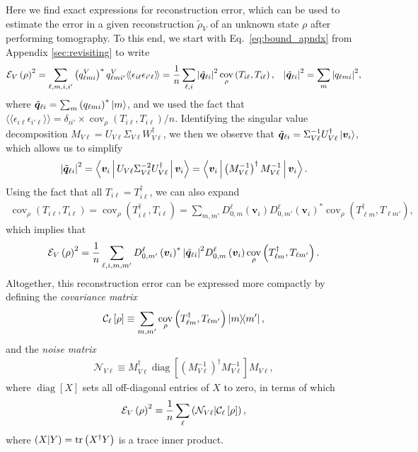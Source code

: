 \documentclass[nofootinbib,twocolumn]{revtex4-1}
\newcommand{\f}[2]{\dfrac{#1}{#2}} %
\newcommand{\p}[1]{\left(#1\right)} %
\renewcommand{\sp}[1]{\left[#1\right]} %
\newcommand{\bk}{\Braket} %
\newcommand{\bbk}[1]{\langle\!\langle #1 \rangle\!\rangle}
\newcommand{\C}{\mathcal{C}}
\newcommand{\E}{\mathcal{E}}
\newcommand{\N}{\mathcal{N}}
\def\obk#1{\mathinner{({#1})}}
\DeclareMathOperator{\cov}{cov}
\DeclareMathOperator{\diag}{diag}
\begin{document}
Here we find exact expressions for reconstruction error, which can be used to estimate the error in a given reconstruction $\tilde\rho_V$ of an unknown state $\rho$ after performing tomography.
To this end, we start with Eq.~\eqref{eq:bound_apndx} from Appendix \ref{sec:revisiting} to write
\begin{align}
  \E_V\p{\rho}^2
  = \sum_{\ell,m,i,i'} \p{q^V_{\ell mi}}^* q^V_{\ell mi'} \bbk{\epsilon_{i\ell}\epsilon_{i'\ell}}
  = \f1n \sum_{\ell,i} \abs{\tilde{\bm q}_{\ell i}}^2 \cov_\rho\p{T_{i\ell},T_{i\ell}},
  &&
  \abs{\tilde{\bm q}_{\ell i}}^2 = \sum_m \abs{q_{\ell mi}}^2,
  \label{eq:error_SM_start}
\end{align}
where $\tilde{\bm q}_{\ell i} = \sum_m \p{q_{\ell mi}}^* \ket{m}$, and we used the fact that $\bbk{\epsilon_{i\ell}\epsilon_{i'\ell}} = \delta_{ii'}\times\cov_\rho\p{T_{i\ell},T_{i\ell}}/n$.
Identifying the singular value decomposition $M_{V\ell} = U_{V\ell} \Sigma_{V\ell} W_{V\ell}^\dag$, we then we observe that $\tilde{\bm q}_{\ell i} = \Sigma_{V\ell}^{-1} U_{V\ell}^\dag \ket{\bm v_i}$, which allows us to simplify
\begin{align}
  \abs{\tilde{\bm q}_{\ell i}}^2
  = \bk{\bm v_i | U_{V\ell} \Sigma_{V\ell}^{-2} U_{V\ell}^\dag | \bm v_i}
  = \bk{\bm v_i| \p{M_{V\ell}^{-1}}^\dag M_{V\ell}^{-1} | \bm v_i}.
\end{align}
Using the fact that all $T_{i\ell}=T_{i\ell}^\dag$, we can also expand
\begin{align}
  \cov_\rho\p{T_{i\ell},T_{i\ell}}
  = \cov_\rho\p{T_{i\ell}^\dag,T_{i\ell}}
  = \sum_{m,m'} D^\ell_{0,m}\p{\bm v_i} D^\ell_{0,m'}\p{\bm v_i}^*
  \cov_\rho\p{T_{\ell m}^\dag, T_{\ell m'}},
\end{align}
which implies that
\begin{align}
  \E_V\p{\rho}^2
  = \f1n \sum_{\ell,i,m,m'}
  D^\ell_{0,m'}\p{\bm v_i}^* \abs{\tilde{\bm q}_{\ell i}}^2
  D^\ell_{0,m}\p{\bm v_i}
  \cov_\rho\p{T_{\ell m}^\dag, T_{\ell m'}}.
\end{align}
Altogether, this reconstruction error can be expressed more compactly by defining the {\it covariance matrix}
\begin{align}
  \C_\ell\sp{\rho} \equiv
  \sum_{m,m'} \cov_\rho\p{T_{\ell m}^\dag, T_{\ell m'}} \op{m}{m'},
\end{align}
and the {\it noise matrix}
\begin{align}
  \N_{V\ell} \equiv M_{V\ell}^\dag \diag\sp{\p{M_{V\ell}^{-1}}^\dag
    M_{V\ell}^{-1}} M_{V\ell},
\end{align}
where $\diag\sp{X}$ sets all off-diagonal entries of $X$ to zero, in terms of which
\begin{align}
  \E_V\p{\rho}^2 = \f1n \sum_\ell \obk{\N_{V\ell}|\C_\ell\sp{\rho}},
  \label{eq:error_SM_mid}
\end{align}
where $\obk{X|Y}=\tr\p{X^\dag Y}$ is a trace inner product.
\end{document}
